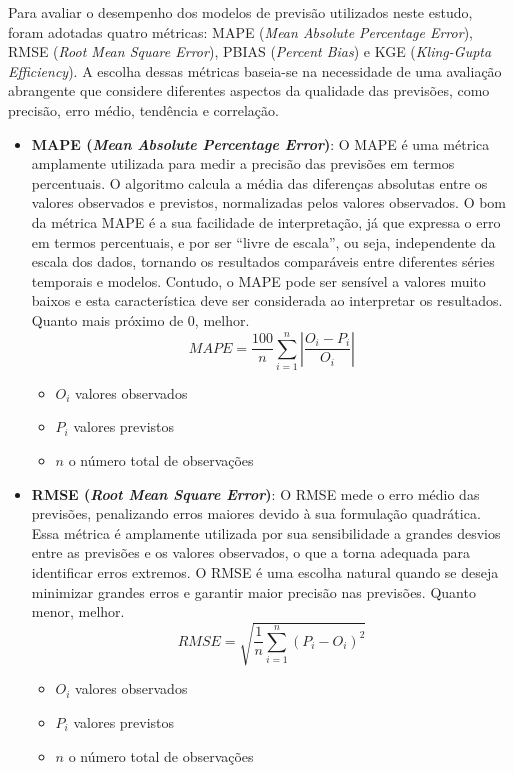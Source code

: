 Para avaliar o desempenho dos modelos de previsão utilizados neste estudo, foram adotadas quatro métricas: MAPE (\textit{Mean Absolute Percentage Error}), RMSE (\textit{Root Mean Square Error}), PBIAS (\textit{Percent Bias}) e KGE (\textit{Kling-Gupta Efficiency}). A escolha dessas métricas baseia-se na necessidade de uma avaliação abrangente que considere diferentes aspectos da qualidade das previsões, como precisão, erro médio, tendência e correlação.

\begin{itemize}
	\item \textbf{MAPE (\textit{Mean Absolute Percentage Error})}: O MAPE é uma métrica amplamente utilizada para medir a precisão das previsões em termos percentuais. O algoritmo calcula a média das diferenças absolutas entre os valores observados e previstos, normalizadas pelos valores observados. O bom da métrica MAPE é a sua facilidade de interpretação, já que expressa o erro em termos percentuais, e por ser ``livre de escala'', ou seja, independente da escala dos dados, tornando os resultados comparáveis entre diferentes séries temporais e modelos. Contudo, o MAPE pode ser sensível a valores muito baixos e esta característica deve ser considerada ao interpretar os resultados. Quanto mais próximo de 0, melhor.\cite{hyndman_fpp3_2024b}
	\begin{equation}
		MAPE = \frac{100}{n} \sum_{i=1}^{n} \left| \frac{O_i - P_i}{O_i} \right|
	\end{equation}
	\begin{itemize}
		\item $O_i$ valores observados
		\item $P_i$ valores previstos
		\item $n$ o número total de observações
	\end{itemize}
	
	\item \textbf{RMSE (\textit{Root Mean Square Error})}: O RMSE mede o erro médio das previsões, penalizando erros maiores devido à sua formulação quadrática. Essa métrica é amplamente utilizada por sua sensibilidade a grandes desvios entre as previsões e os valores observados, o que a torna adequada para identificar erros extremos. O RMSE é uma escolha natural quando se deseja minimizar grandes erros e garantir maior precisão nas previsões. Quanto menor, melhor.\cite{hyndman_fpp3_2024b}
	\begin{equation}
		RMSE = \sqrt{\frac{1}{n} \sum_{i=1}^{n} (P_i - O_i)^2}
	\end{equation}
	\begin{itemize}
		\item $O_i$ valores observados
		\item $P_i$ valores previstos
		\item $n$ o número total de observações
	\end{itemize}


\end{itemize}
